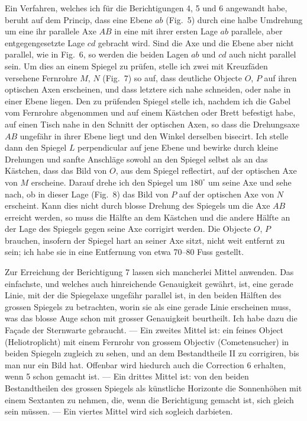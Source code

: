\documentclass[12pt,a4paper]{article}
\theoremstyle{plain}
\theoremstyle{definition}
\theoremstyle{remark}
\begin{document}
Ein Verfahren, welches ich f\"ur die Berichtigungen 4, 5 und 6 angewandt habe, beruht auf dem Princip, dass eine Ebene $ab$ (Fig.~5) durch eine halbe Umdrehung um eine ihr parallele Axe $AB$ in eine mit ihrer ersten Lage $ab$ parallele, aber entgegengesetzte Lage $cd$ gebracht wird. Sind die Axe und die Ebene aber nicht parallel, wie in Fig.~6, so werden die beiden Lagen $ab$ und $cd$ auch nicht parallel sein. Um dies an einem Spiegel zu pr\"ufen, stelle ich zwei mit Kreuzf\"aden versehene Fernrohre $M$, $N$ (Fig.~7) so auf, dass deutliche Objecte $O$, $P$ auf ihren optischen Axen erscheinen, und dass letztere sich nahe schneiden, oder nahe in einer Ebene liegen. Den zu pr\"ufenden Spiegel stelle ich, nachdem ich die Gabel vom Fernrohre abgenommen und auf einem K\"astchen oder Brett befestigt habe, auf einen Tisch nahe in den Schnitt der optischen Axen, so dass die Drehungsaxe $AB$ ungef\"ahr in ihrer Ebene liegt und den Winkel derselben bisecirt. Ich stelle dann den Spiegel $L$ perpendicular auf jene Ebene und bewirke durch kleine Drehungen und sanfte Anschl\"age sowohl an den Spiegel selbst als an das K\"astchen, dass das Bild von $O$, aus dem Spiegel reflectirt, auf der optischen Axe von $M$ erscheine. Darauf drehe ich den Spiegel um $180^{\circ}$ um seine Axe und sehe nach, ob in dieser Lage (Fig.~8) das Bild von $P$ auf der optischen Axe von $N$ erscheint. Kann dies nicht durch blosse Drehung des Spiegels um die Axe $AB$ erreicht werden, so muss die H\"alfte an dem K\"astchen und die andere H\"alfte an der Lage des Spiegels gegen seine Axe corrigirt werden. Die Objecte $O$, $P$ brauchen, insofern der Spiegel hart an seiner Axe sitzt, nicht weit entfernt zu sein; ich habe sie in eine Entfernung von etwa 70--80 Fuss gestellt.

Zur Erreichung der Berichtigung 7 lassen sich mancherlei Mittel anwenden. Das einfachste, und welches auch hinreichende Genauigkeit gew\"ahrt, ist, eine gerade Linie, mit der die Spiegelaxe ungef\"ahr parallel ist, in den beiden H\"alften des grossen Spiegels zu betrachten, worin sie als eine gerade Linie erscheinen muss, was das blosse Auge schon mit grosser Genauigkeit beurtheilt. Ich habe dazu die Fa\c{c}ade der Sternwarte gebraucht. --- Ein zweites Mittel ist: ein feines Object (Heliotroplicht) mit einem Fernrohr von grossem Objectiv (Cometensucher) in beiden Spiegeln zugleich zu sehen, und an dem Bestandtheile II zu corrigiren, bis man nur ein Bild hat. Offenbar wird hiedurch auch die Correction 6 erhalten, wenn 5 schon gemacht ist. --- Ein drittes Mittel ist: von den beiden Bestandtheilen des grossen Spiegels als k\"unstliche Horizonte die Sonnenh\"ohen mit einem Sextanten zu nehmen, die, wenn die Berichtigung gemacht ist, sich gleich sein m\"ussen. --- Ein viertes Mittel wird sich sogleich darbieten.
\end{document}
